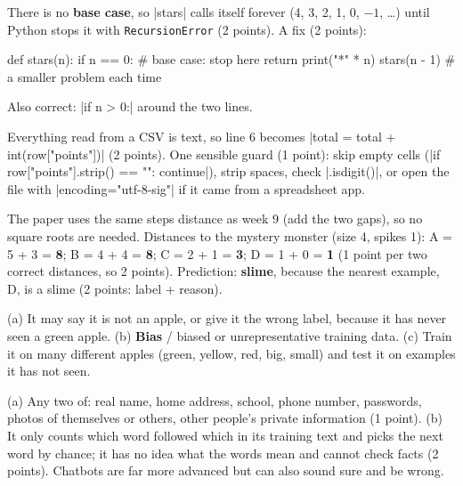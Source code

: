 \begin{answer}
There is no \textbf{base case}, so \py|stars| calls itself forever (4, 3, 2, 1, 0, $-1$, \ldots)
until Python stops it with \texttt{RecursionError} (2 points). A fix (2 points):
\begin{pycode}
def stars(n):
    if n == 0:          # base case: stop here
        return
    print("*" * n)
    stars(n - 1)        # a smaller problem each time
\end{pycode}
Also correct: \py|if n > 0:| around the two lines.
\end{answer}

\begin{answer}
Everything read from a CSV is text, so line 6 becomes \py|total = total + int(row["points"])|
(2 points). One sensible guard (1 point): skip empty cells
(\py|if row["points"].strip() == "": continue|), strip spaces, check \py|.isdigit()|, or open
the file with \py|encoding="utf-8-sig"| if it came from a spreadsheet app.
\end{answer}

\begin{answer}
The paper uses the same steps distance as week 9 (add the two gaps), so no square roots are
needed. Distances to the mystery monster (size 4, spikes 1): A = 5 + 3 = \textbf{8}; B = 4 + 4 = \textbf{8};
C = 2 + 1 = \textbf{3}; D = 1 + 0 = \textbf{1} (1 point per two correct distances, so 2 points).
Prediction: \textbf{slime}, because the nearest example, D, is a slime (2 points: label + reason).
\end{answer}

\begin{answer}
(a) It may say it is not an apple, or give it the wrong label, because it has never seen a green
apple. (b) \textbf{Bias} / biased or unrepresentative training data. (c) Train it on many
different apples (green, yellow, red, big, small) and test it on examples it has not seen.
\end{answer}

\begin{answer}
(a) Any two of: real name, home address, school, phone number, passwords, photos of themselves or
others, other people's private information (1 point). (b) It only counts which word followed which
in its training text and picks the next word by chance; it has no idea what the words mean and
cannot check facts (2 points). Chatbots are far more advanced but can also sound sure and be wrong.
\end{answer}


